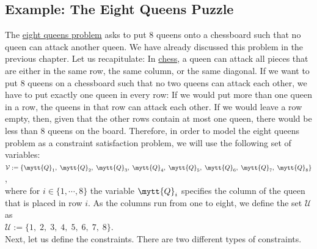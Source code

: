 \subsection{Example: The Eight Queens Puzzle}
The \href{https://en.wikipedia.org/wiki/Eight_queens_puzzle}{eight queens problem} asks to put 8 queens onto a
chessboard such that no queen can attack another queen.  We have already discussed this problem in the previous
chapter.  Let us recapitulate: In \href{https://en.wikipedia.org/wiki/Chess}{chess},
a queen can attack all pieces that are either in the same row, the same column, or the same diagonal.  If we
want to put 8 queens on a chessboard such that no two queens can attack each other, we have to put exactly one
queen in every row:  If we would put more than one queen in a row, the queens in that row can attack each other.
If we would leave a row empty, then, given that the other rows contain at most one queen, there would be less
than 8 queens on the board.  Therefore, in order to model the eight queens problem as a constraint satisfaction
problem, we will use the following set of variables:
\\[0.2cm]
\hspace*{1.3cm}
$\mathcal{V} := \{ \mytt{Q}_1,\; \mytt{Q}_2,\; \mytt{Q}_3,\; \mytt{Q}_4,\; \mytt{Q}_5,\; \mytt{Q}_6,\; \mytt{Q}_7,\;\mytt{Q}_8 \}$,
\\[0.2cm]
where for $i \in \{1,\cdots,8\}$ the variable $\mytt{Q}_i$ specifies the column of the queen that is placed in
row $i$.   As the columns run from one to eight, we define the set $\mathcal{U}$ as
\\[0.2cm]
\hspace*{1.3cm}
$\mathcal{U} := \{1,\;2,\;3,\;4,\;5,\;6,\;7,\;8\}$.
\\[0.2cm]
Next, let us define the constraints.  There are two different types of constraints.
